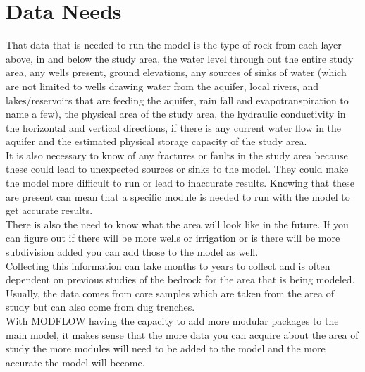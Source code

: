 \documentclass[]{report}
\begin{document}
\chapter{Data Needs}

That data that is needed to run the model is the type of rock from each layer above, in and below the study area, the water level through out the entire study area, any wells present, ground elevations, any sources of sinks of water (which are not limited to wells drawing water from the aquifer, local rivers, and lakes/reservoirs that are feeding the aquifer, rain fall and evapotranspiration to name a few), the physical area of the study area, the hydraulic conductivity in the horizontal and vertical directions, if there is any current water flow in the aquifer and the estimated physical storage capacity of the study area. \\
It is also necessary to know of any fractures or faults in the study area because these could lead to unexpected sources or sinks to the model. They could make the model more difficult to run or lead to inaccurate results. Knowing that these are present can mean that a specific module is needed to run with the model to get accurate results. \\
There is also the need to know what the area will look like in the future. If you can figure out if there will be more wells or irrigation or is there will be more subdivision added you can add those to the model as well. \\
Collecting this information can take months to years to collect and is often dependent on previous studies of the bedrock for the area that is being modeled. Usually, the data comes from core samples which are taken from the area of study but can also come from dug trenches. \\
With MODFLOW having the capacity to add more modular packages to the main model, it makes sense that the more data you can acquire about the area of study the more modules will need to be added to the model and the more accurate the model will become. 
\end{document}
